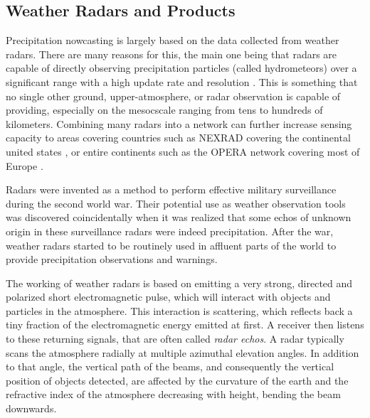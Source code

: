 \subsection*{Weather Radars and Products}

	

Precipitation nowcasting is largely based on the data collected from weather radars. 
There are many reasons for this, the main one being that radars are capable of directly observing precipitation particles (called hydrometeors) over a significant range with a high update rate and resolution \cite{schmid2019nowcasting}. This is something that no single other ground, upper-atmosphere, or radar observation is capable of providing, especially on the mesocscale ranging from tens to hundreds of kilometers. Combining many radars into a network can further increase sensing capacity to areas covering countries such as NEXRAD covering the continental united states \cite{noauthor_next_2020}, or entire continents such as the OPERA network covering most of Europe \cite{saltikoff_opera_2019}. 


Radars were invented as a method to perform effective military surveillance during the second world war. Their potential use as weather observation tools was discovered coincidentally when it was realized that some echos of unknown origin in these surveillance radars were indeed precipitation. After the war, weather radars started to be routinely used in affluent parts of the world to provide precipitation observations and warnings.\cite{fabry_radar_2018}


The working of weather radars is based on emitting a very strong, directed and polarized short  electromagnetic pulse, which will interact with objects and particles in the atmosphere. This interaction is scattering, which reflects back a tiny fraction of the electromagnetic energy emitted at first. A receiver then listens to these returning signals, that are often called \textit{radar echos}. A radar typically scans the atmosphere radially at multiple azimuthal elevation angles. In addition to that angle, the vertical path of the beams, and consequently the vertical position of objects detected, are affected by the curvature of the earth and the refractive index of the atmosphere decreasing with height, bending the beam downwards. \cite{fabry_radar_2018}

